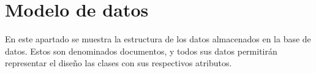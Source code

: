\section{Modelo de datos}

En este apartado se muestra la estructura de los datos almacenados en la base de datos. Estos son denominados documentos, y todos sus datos permitirán representar el diseño las clases con sus respectivos atributos.


